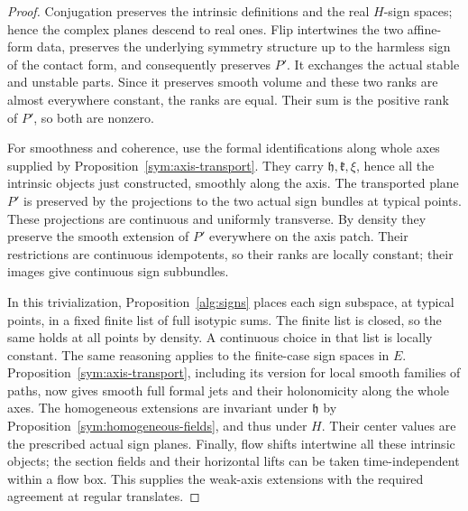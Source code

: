 \begin{proof}
Conjugation preserves the intrinsic definitions and the real
$H$-sign spaces; hence the complex planes descend to real ones.
Flip intertwines the two affine-form data, preserves the
underlying symmetry structure up to the harmless sign of the
contact form, and consequently preserves $P'$. It exchanges the
actual stable and unstable parts. Since it preserves smooth volume
and these two ranks are almost everywhere constant, the ranks are
equal. Their sum is the positive rank of $P'$, so both are nonzero.

For smoothness and coherence, use the formal identifications along
whole axes supplied by Proposition~\ref{sym:axis-transport}.
They carry $\mathfrak h,\mathfrak k,\xi$, hence all the intrinsic
objects just constructed, smoothly along the axis. The transported
plane $P'$ is preserved by the projections to the two actual sign
bundles at typical points. These projections are continuous and
uniformly transverse. By density they preserve the smooth extension
of $P'$ everywhere on the axis patch. Their restrictions are
continuous idempotents, so their ranks are locally constant; their
images give continuous sign subbundles.

In this trivialization, Proposition~\ref{alg:signs} places each
sign subspace, at typical points, in a fixed finite list of full
isotypic sums. The finite list is closed, so the same holds at all
points by density. A continuous choice in that list is locally
constant. The same reasoning applies to the finite-case sign
spaces in $E$. Proposition~\ref{sym:axis-transport}, including
its version for local smooth families of paths, now gives smooth
full formal jets and their holonomicity along the whole axes.
The homogeneous extensions are invariant under $\mathfrak h$ by
Proposition~\ref{sym:homogeneous-fields}, and thus under $H$.
Their center values are the prescribed actual sign planes. Finally,
flow shifts intertwine all these intrinsic objects; the section
fields and their horizontal lifts can be taken time-independent
within a flow box. This supplies the weak-axis extensions with the
required agreement at regular translates.
\end{proof}

